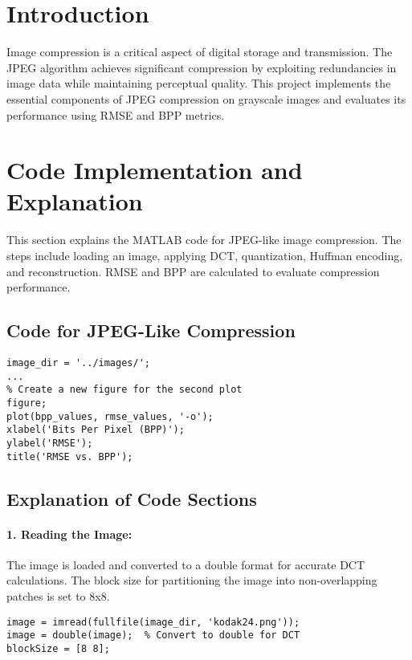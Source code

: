 \documentclass{article}
\begin{document}
\section{Introduction}
Image compression is a critical aspect of digital storage and transmission. The JPEG algorithm achieves significant compression by exploiting redundancies in image data while maintaining perceptual quality. This project implements the essential components of JPEG compression on grayscale images and evaluates its performance using RMSE and BPP metrics.

\section{Code Implementation and Explanation}
This section explains the MATLAB code for JPEG-like image compression. The steps include loading an image, applying DCT, quantization, Huffman encoding, and reconstruction. RMSE and BPP are calculated to evaluate compression performance.

\subsection{Code for JPEG-Like Compression}

\begin{lstlisting}[caption=Image Compression Code, label=lst:compression_code]
% Set image directory path
image_dir = '../images/';
...
% Create a new figure for the second plot
figure;
plot(bpp_values, rmse_values, '-o');
xlabel('Bits Per Pixel (BPP)');
ylabel('RMSE');
title('RMSE vs. BPP');
\end{lstlisting}

\subsection{Explanation of Code Sections}

\paragraph{1. Reading the Image:} 
The image is loaded and converted to a double format for accurate DCT calculations. The block size for partitioning the image into non-overlapping patches is set to 8x8.

\begin{lstlisting}[caption=Reading the Image]
image = imread(fullfile(image_dir, 'kodak24.png'));
image = double(image);  % Convert to double for DCT
blockSize = [8 8];
\end{lstlisting}
\end{document}
